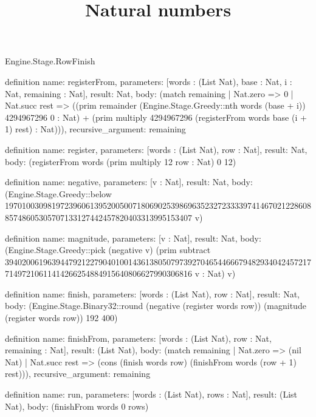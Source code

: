 \begin{lexlean}{Engine.Stage.RowFinish}
\title{Natural numbers}
\begin{semanticmodule}
definition{
  name: registerFrom,
  parameters: [words : (List Nat), base : Nat, i : Nat, remaining : Nat],
  result: Nat,
  body: (match remaining
    | Nat.zero => 0
    | Nat.succ rest => ((prim remainder (Engine.Stage.Greedy::nth words (base + i)) 4294967296 0 : Nat) + (prim multiply 4294967296 (registerFrom words base (i + 1) rest) : Nat))),
  recursive_argument: remaining
}

definition{
  name: register,
  parameters: [words : (List Nat), row : Nat],
  result: Nat,
  body: (registerFrom words (prim multiply 12 row : Nat) 0 12)
}

definition{
  name: negative,
  parameters: [v : Nat],
  result: Nat,
  body: (Engine.Stage.Greedy::below 19701003098197239606139520050071806902539869635232723333974146702122860885748605305707133127442457820403313995153407 v)
}

definition{
  name: magnitude,
  parameters: [v : Nat],
  result: Nat,
  body: (Engine.Stage.Greedy::pick (negative v) (prim subtract 39402006196394479212279040100143613805079739270465446667948293404245721771497210611414266254884915640806627990306816 v : Nat) v)
}

definition{
  name: finish,
  parameters: [words : (List Nat), row : Nat],
  result: Nat,
  body: (Engine.Stage.Binary32::round (negative (register words row)) (magnitude (register words row)) 192 400)
}

definition{
  name: finishFrom,
  parameters: [words : (List Nat), row : Nat, remaining : Nat],
  result: (List Nat),
  body: (match remaining
    | Nat.zero => (nil Nat)
    | Nat.succ rest => (cons (finish words row) (finishFrom words (row + 1) rest))),
  recursive_argument: remaining
}

definition{
  name: run,
  parameters: [words : (List Nat), rows : Nat],
  result: (List Nat),
  body: (finishFrom words 0 rows)
}
\end{semanticmodule}
\end{lexlean}
